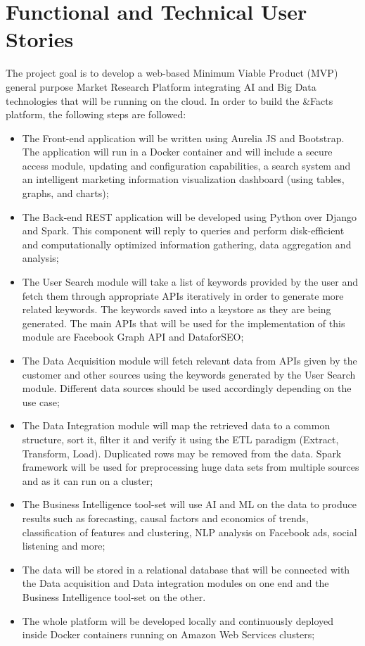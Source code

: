 \newpage
\section{Functional and Technical User Stories}
The project goal is to develop a web-based Minimum Viable Product (MVP) general purpose Market Research Platform integrating AI and Big Data technologies that will be running on the cloud. In order to build the \&Facts platform, the following steps are followed:
\begin{itemize} 
	\item The Front-end application will be written using Aurelia JS and Bootstrap. The application will run in a Docker container and will include a secure access module, updating and configuration capabilities, a search system and an intelligent marketing information visualization dashboard (using tables, graphs, and charts);
	\item The Back-end REST application will be developed using Python over Django and Spark. This component will reply to queries and perform disk-efficient and computationally optimized information gathering, data aggregation and analysis;
	\item The User Search module will take a list of keywords provided by the user and fetch them through appropriate APIs iteratively in order to generate more related keywords. The keywords  saved into a keystore as they are being generated. The main APIs that will be used for the implementation of this module are Facebook Graph API and DataforSEO;
	\item The Data Acquisition module will fetch relevant data from APIs given by the customer and other sources using the keywords generated by the User Search module. Different data sources should be used accordingly depending on the use case;
	\item The Data Integration module will map the retrieved data to a common structure, sort it, filter it and verify it using the ETL paradigm (Extract, Transform, Load). Duplicated rows may be removed from the data. Spark framework will be used for preprocessing huge data sets from multiple sources and as it can run on a cluster;
	\item The Business Intelligence tool-set will use AI and ML on the data to produce results such as forecasting, causal factors and economics of trends, classification of features and clustering, NLP analysis on Facebook ads, social listening and more;
	\item The data will be stored in a relational database that will be connected with the Data acquisition and Data integration modules on one end and the Business Intelligence tool-set on the other.
	\item The whole platform will be developed locally and continuously deployed inside Docker containers running on Amazon Web Services clusters;
\end{itemize} 
